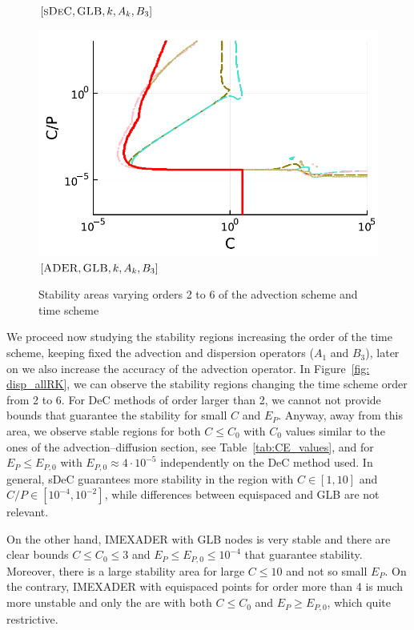 \begin{figure}
\begin{minipage}[t]{0.325\textwidth}
	\small$[\textsc{sDeC}, \textsc{GLB},k,A_k,B_3]$\par
	\end{minipage}
	\begin{minipage}[t]{0.325\textwidth}
		\centering
		\includegraphics[width=\textwidth]{pdf/pdepics/disp/IMEXADER_gaussLobatto_disp_advTMM_2-6_newE.pdf}
		\small$[\textsc{ADER}, \textsc{GLB},k,A_k,B_3]$\par
	\end{minipage}
	\caption{Stability areas varying orders 2 to 6 of the advection scheme and time scheme}
	\label{fig: disp_alladv_GLB}
\end{figure}
We proceed now studying the stability regions increasing the order of the time scheme, keeping fixed the advection and dispersion operators ($A_1$ and $B_3$), later on we also increase the accuracy of the advection operator.
In Figure~\ref{fig: disp_allRK}, we can observe the stability regions changing the time scheme order from 2 to 6. 
For DeC methods of order larger than 2, we cannot  not provide bounds that guarantee the stability for small $C$ and $E_P$.
Anyway, away from this area, we observe stable regions for both $C\leq C_0$ with $C_0$ values similar to the ones of the advection--diffusion section, see Table~\ref{tab:CE_values}, and for $E_P\leq E_{P,0}$ with $E_{P,0}\approx 4\cdot 10^{-5}$ independently on the DeC method used.
In general, sDeC guarantees more stability in the region with $C\in [1,10]$ and $C/P\in [10^{-4},10^{-2}]$, while differences between equispaced and GLB are not relevant.

On the other hand, IMEXADER with GLB nodes is very stable and there are clear bounds $C\leq C_0\leq 3$ and $E_P\leq E_{P,0}\leq 10^{-4}$ that guarantee stability. Moreover, there is a large stability area for large $C\leq 10$ and not so small $E_P$.
On the contrary, IMEXADER with equispaced points for order more than 4 is much more unstable and only the are with both $C\leq C_0$ and $E_P \geq E_{P,0}$, which quite restrictive.

